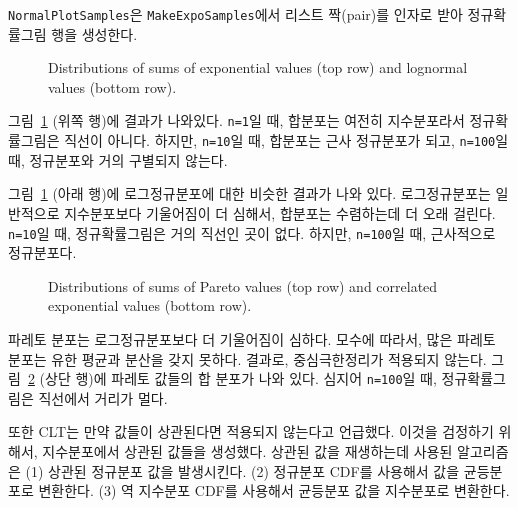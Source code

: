 {\tt NormalPlotSamples}은 {\tt MakeExpoSamples}에서 리스트 짝(pair)를 인자로 받아 정규확률그림 행을 생성한다.

\begin{figure}
\caption{Distributions of sums of exponential values (top row) and
lognormal values (bottom row).}
\label{normal1}
\end{figure}

그림~\ref{normal1} (위쪽 행)에 결과가 나와있다.
{\tt n=1}일 때, 합분포는 여전히 지수분포라서 정규확률그림은 직선이 아니다.
하지만, {\tt n=10}일 때, 합분포는 근사 정규분포가 되고,
{\tt n=100}일 때, 정규분포와 거의 구별되지 않는다.

그림~\ref{normal1} (아래 행)에 로그정규분포에 대한 비슷한 결과가 나와 있다.
로그정규분포는 일반적으로 지수분포보다 기울어짐이 더 심해서, 합분포는 수렴하는데 더 오래 걸린다. {\tt n=10}일 때, 정규확률그림은 거의 직선인 곳이 없다. 하지만, {\tt n=100}일 때, 근사적으로 정규분포다.

\begin{figure}
\caption{Distributions of sums of Pareto values (top row) and
correlated exponential values (bottom row).}
\label{normal2}
\end{figure}

파레토 분포는 로그정규분포보다 더 기울어짐이 심하다. 모수에 따라서, 많은 파레토 분포는 유한 평균과 분산을 갖지 못하다. 결과로, 중심극한정리가 적용되지 않는다. 그림~\ref{normal2} (상단 행)에 파레토 값들의 합 분포가 나와 있다. 심지어 {\tt n=100}일 때, 정규확률그림은 직선에서 거리가 멀다.

또한 CLT는 만약 값들이 상관된다면 적용되지 않는다고 언급했다. 이것을 검정하기 위해서, 지수분포에서 상관된 값들을 생성했다. 
상관된 값을 재생하는데 사용된 알고리즘은 (1) 상관된 정규분포 값을 발생시킨다. (2) 정규분포 CDF를 사용해서 값을 균등분포로 변환한다. (3) 역 지수분포 CDF를 사용해서 균등분포 값을 지수분포로 변환한다.



